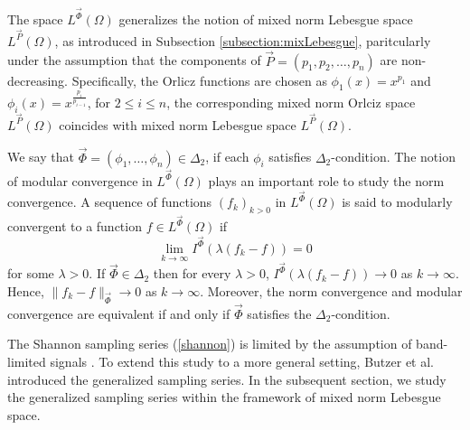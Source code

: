 \documentclass[11pt, a4paper]{article}
\theoremstyle{definition}
\numberwithin{equation}{section}
\newcommand{\vc}[1]{\overrightarrow{#1}}
\begin{document}
The space $L^{\vc{\Phi}}(\Omega)$ generalizes the notion of mixed norm Lebesgue space $L^{\vc{P}}(\Omega)$, as introduced in Subsection \ref{subsection:mixLebesgue}, paritcularly under the assumption that the components of $\vc{P}=(p_1,p_2,\dots, p_n)$ are non-decreasing. Specifically, the Orlicz functions are chosen as $\phi_1(x)=x^{p_1}$ and $\phi_i(x)=x^\frac{p_i}{p_{i-1}}$, for $2 \leq i \leq n$, the corresponding mixed norm Orlciz space $L^{\vc{P}}(\Omega)$ coincides with mixed norm Lebesgue space $L^{\vc{P}}(\Omega)$.

We say that $\overrightarrow{\Phi}=(\phi_1,\dots,\phi_n)\in \Delta_{2}$, if each $\phi_i$ satisfies $\Delta_{2}$-condition. The notion of modular convergence in $L^{\overrightarrow{\Phi}}(\Omega)$ plays an important role to study the norm convergence. A sequence of functions $(f_k)_{k > 0}$ in $L^{\overrightarrow{\Phi}}(\Omega)$ is said to modularly convergent to a function $f \in L^{\vc{\Phi}}(\Omega)$ if $$\lim_{k\to\infty}I^{\vc{\Phi}}(\lambda(f_k-f))=0$$ for some $\lambda >0.$ If $\vc{\Phi}\in \Delta_2$ then for every $\lambda > 0$, $I^{\vc{\Phi}}(\lambda(f_k-f)) \to 0$ as $k\to \infty$. Hence, $\|f_k-f\|_{\vc{\Phi}}\to 0$ as $k\to \infty$. Moreover, the norm convergence and modular convergence are equivalent if and only if $\overrightarrow{\Phi}$ satisfies the $\Delta_2$-condition. 





The Shannon sampling series (\ref{shannon}) is limited by the assumption of band-limited signals \cite{vgood}. To extend this study to a more general setting, Butzer et al. \cite{multigen} introduced the generalized sampling series. 
In the subsequent section, we study the generalized sampling series within the framework of mixed norm Lebesgue space.
\end{document}
